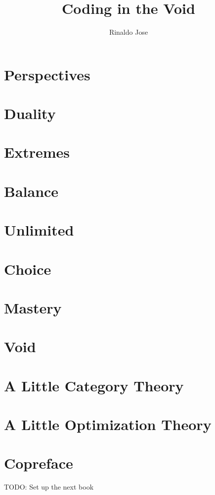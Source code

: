 \documentclass[letterpaper,oneside]{memoir}
\title{Coding in the Void}
\author{Rinaldo Jose}
\begin{document}
\frontmatter

\tableofcontents



\mainmatter

\chapter{Perspectives}
\chapter{Duality}
\chapter{Extremes}
\chapter{Balance}
\chapter{Unlimited}
\chapter{Choice}
\chapter{Mastery}
\chapter{Void}

\appendix
\chapter{A Little Category Theory}
\chapter{A Little Optimization Theory}

\backmatter
\chapter{Copreface}
TODO: Set up the next book
\end{document}
